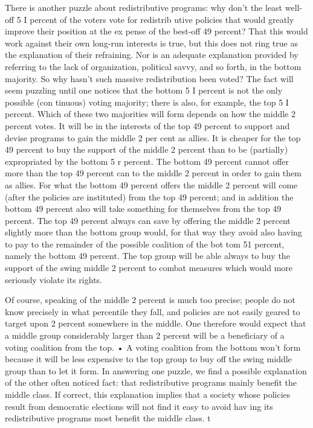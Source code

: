 \documentclass[11pt,openany]{book}
\begin{document}
There is another puzzle about redistributive programs: why don't the least well-off 5 I percent of the voters vote for redistrib utive policies that would greatly improve their position at the ex pense of the best-off 49 percent? That this would work against their own long-run interests is true, but this does not ring true as the explanation of their refraining. Nor is an adequate explanation provided by referring to the lack of organization, political savvy, and so forth, in the bottom majority. So why hasn't such massive redistribution been voted? The fact will seem puzzling until one notices that the bottom 5 I percent is not the only possible (con tinuous) voting majority; there is also, for example, the top 5 I percent. Which of these two majorities will form depends on how the middle 2 percent votes. It will be in the interests of the top 49 percent to support and devise programs to gain the middle 2 per cent as allies. It is cheaper for the top 49 percent to buy the support of the middle 2 percent than to be (partially) expropriated by the bottom 5 r percent. The bottom 49 percent cannot offer more than the top 49 percent can to the middle 2 percent in order to gain them as allies. For what the bottom 49 percent offers the middle 2 percent will come (after the policies are instituted) from the top 49 percent; and in addition the bottom 49 percent also will take something for themselves from the top 49 percent. The top 49 percent always can save by offering the middle 2 percent slightly more than the bottom group would, for that way they avoid also having to pay to the remainder of the possible coalition of the bot tom 51 percent, namely the bottom 49 percent. The top group will be able always to buy the support of the swing middle 2 percent to combat measures which would more seriously violate its rights. 

Of course, speaking of the middle 2 percent is much too precise; people do not know precisely in what percentile they fall, and policies are not easily geared to target upon 2 percent somewhere in the middle. One therefore would expect that a middle group considerably larger than 2 percent will be a beneficiary of a voting coalition from the top. • A voting coalition from the bottom won't form because it will be less expensive to the top group to buy off the swing middle group than to let it form. In answering one puzzle, we find a possible explanation of the other often noticed fact: that redistributive programs mainly benefit the middle class. If correct, this explanation implies that a society whose policies result from democratic elections will not find it easy to avoid hav ing its redistributive programs most benefit the middle class. t 
\end{document}
